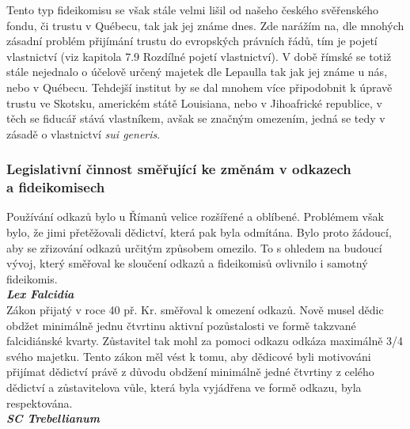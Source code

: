 \documentclass{article}
\begin{document}
Tento typ fideikomisu se však stále velmi lišil od našeho českého svěřenského fondu, či trustu v Québecu, tak jak jej známe dnes. Zde narážím na, dle mnohých zásadní problém přijímání trustu do evropských právních řádů, tím je pojetí vlastnictví (viz kapitola 7.9 Rozdílné pojetí vlastnictví). V době římské se totiž stále nejednalo o účelově určený majetek dle Lepaulla tak jak jej známe u nás, nebo v Québecu. Tehdejší institut by se dal mnohem více připodobnit k úpravě trustu ve Skotsku, americkém státě Louisiana, nebo v Jihoafrické republice, v těch se fiducář stává vlastníkem, avšak se značným omezením, jedná se tedy v zásadě o vlastnictví \textit{sui generis}.\\


\subsubsection{Legislativní činnost směřující ke změnám v odkazech\\ a fideikomisech}

Používání odkazů bylo u Římanů velice rozšířené a oblíbené. Problémem však bylo, že jimi přetěžovali dědictví, která pak byla odmítána. Bylo proto žádoucí, aby se zřizování odkazů určitým způsobem omezilo. To s ohledem na budoucí vývoj, který směřoval ke sloučení odkazů a fideikomisů ovlivnilo i samotný fideikomis.\\

\noindent\textbf{\textit{Lex Falcidia}}\\

Zákon přijatý v roce 40 př. Kr. směřoval k omezení odkazů. Nově musel dědic obdžet minimálně jednu čtvrtinu aktivní pozůstalosti ve formě takzvané falcidiánské kvarty. Zůstavitel tak mohl za pomoci odkazu odkáza maximálně 3/4 svého majetku. Tento zákon měl vést k tomu, aby dědicové byli motivováni přijímat dědictví právě z důvodu obdžení minimálně jedné čtvrtiny z celého dědictví a zůstavitelova vůle, která byla vyjádřena ve formě odkazu, byla respektována.\\

\noindent\textbf{\textit{SC Trebellianum}}\\
\end{document}
